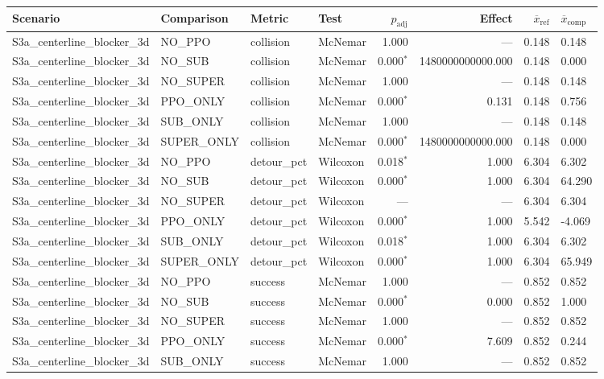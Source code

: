\begin{tabular}{llllrrrl}
\toprule
Scenario & Comparison & Metric & Test & $p_\mathrm{adj}$ & Effect & $\overline{x}_\mathrm{ref}$ & $\overline{x}_\mathrm{comp}$ \\
\midrule
  S3a_centerline_blocker_3d & NO_PPO & collision & McNemar & 1.000 & --- & 0.148 & 0.148 \\
  S3a_centerline_blocker_3d & NO_SUB & collision & McNemar & 0.000$^{*}$ & 1480000000000.000 & 0.148 & 0.000 \\
  S3a_centerline_blocker_3d & NO_SUPER & collision & McNemar & 1.000 & --- & 0.148 & 0.148 \\
  S3a_centerline_blocker_3d & PPO_ONLY & collision & McNemar & 0.000$^{*}$ & 0.131 & 0.148 & 0.756 \\
  S3a_centerline_blocker_3d & SUB_ONLY & collision & McNemar & 1.000 & --- & 0.148 & 0.148 \\
  S3a_centerline_blocker_3d & SUPER_ONLY & collision & McNemar & 0.000$^{*}$ & 1480000000000.000 & 0.148 & 0.000 \\
  S3a_centerline_blocker_3d & NO_PPO & detour_pct & Wilcoxon & 0.018$^{*}$ & 1.000 & 6.304 & 6.302 \\
  S3a_centerline_blocker_3d & NO_SUB & detour_pct & Wilcoxon & 0.000$^{*}$ & 1.000 & 6.304 & 64.290 \\
  S3a_centerline_blocker_3d & NO_SUPER & detour_pct & Wilcoxon & --- & --- & 6.304 & 6.304 \\
  S3a_centerline_blocker_3d & PPO_ONLY & detour_pct & Wilcoxon & 0.000$^{*}$ & 1.000 & 5.542 & -4.069 \\
  S3a_centerline_blocker_3d & SUB_ONLY & detour_pct & Wilcoxon & 0.018$^{*}$ & 1.000 & 6.304 & 6.302 \\
  S3a_centerline_blocker_3d & SUPER_ONLY & detour_pct & Wilcoxon & 0.000$^{*}$ & 1.000 & 6.304 & 65.949 \\
  S3a_centerline_blocker_3d & NO_PPO & success & McNemar & 1.000 & --- & 0.852 & 0.852 \\
  S3a_centerline_blocker_3d & NO_SUB & success & McNemar & 0.000$^{*}$ & 0.000 & 0.852 & 1.000 \\
  S3a_centerline_blocker_3d & NO_SUPER & success & McNemar & 1.000 & --- & 0.852 & 0.852 \\
  S3a_centerline_blocker_3d & PPO_ONLY & success & McNemar & 0.000$^{*}$ & 7.609 & 0.852 & 0.244 \\
  S3a_centerline_blocker_3d & SUB_ONLY & success & McNemar & 1.000 & --- & 0.852 & 0.852 \\

\end{tabular}
